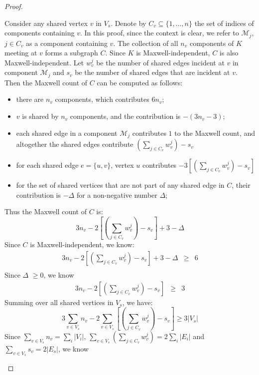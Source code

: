 \documentclass[10pt]{article}
\def\M{\mathcal {M}}
\begin{document}
\begin{proof}
\begin{enumerate}[(a)]
Consider any shared vertex $v$ in $V_s$. Denote by $C_v \subseteq \{1,\ldots,n\}$ the set of indices of components containing $v$. In this proof, since the context is clear, we refer to $\M_j$, $j\in C_v$ as a component containing $v$. The collection of all $n_v$ components of $K$ meeting at $v$ forms a subgraph $C$. Since $K$ is Maxwell-independent, $C$ is also Maxwell-independent. Let $w_v^{j}$ be the number of shared edges incident at $v$ in component $\M_j$ and $s_v$ be the number of shared edges that are incident at $v$. Then the Maxwell count of $C$ can be computed as follows:
\begin{itemize}
\item there are $n_v$ components, which contributes $6 n_v$;
\item $v$ is shared by $n_v$ components, and the contribution is $ - (3n_v -3)$;
\item each shared edge in a component $\M_{j}$ contributes $1$ to the Maxwell count, and altogether the shared edges contribute $(\sum_{j \in  C_v} w_v^{j}) - s_v$
\item for each shared edge $e=\{u, v\}$, vertex $u$ contributes $ -3[(\sum_{j \in  C_v} w_v^{j}) - s_v]$
\item for the set of shared vertices that are not part of any shared edge in $C$, their contribution is $-\Delta$ for a non-negative number $\Delta$;
\end{itemize}
Thus the Maxwell count of $C$ is:
\begin{equation*}
3n_v - 2[(\sum\limits_{j \in  C_v} w_v^{j}) - s_v] +3 - \Delta
\end{equation*}
Since $C$ is Maxwell-independent, we know:
\begin{eqnarray*}
3n_v - 2 [(\sum\limits_{j \in  C_v} w_v^{j}) - s_v] +3 - \Delta& \geq& 6\\
\end{eqnarray*}
Since $\Delta $ $\ge 0$, we know
\begin{eqnarray*}
3n_v - 2 [(\sum\limits_{j \in  C_v} w_v^{j}) - s_v] &\ge& 3
\end{eqnarray*}
Summing over all shared vertices in $V_s$, we have:
\begin{equation*}
3\sum\limits_{v\in V_s}n_v - 2 \sum\limits_{v\in V_s}[(\sum\limits_{j \in  C_v} w_v^{j}) - s_v] \geq 3|V_s|
\end{equation*}
Since $\sum\limits_{v\in V_s}n_v  =\sum\limits_i |V_i|$, $\sum\limits_{v\in V_s}(\sum\limits_{j \in  C_v} w_v^{j})= 2\sum\limits_i |E_i|$ and $\sum\limits_{v\in V_s} s_v =2 |E_s|$, we know

\end{enumerate}
\end{proof}
\end{document}
